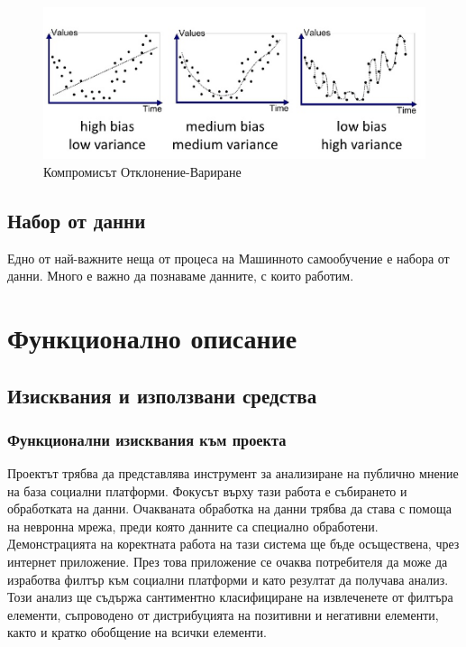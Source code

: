 \documentclass{article}
\begin{document}
\begin{figure}[H]
  \centering
  \captionsetup{justification=centering}
  \includegraphics[width=450px, keepaspectratio]{chapter-03/bias-variance.png}
  \caption{Компромисът Отклонение-Вариране}
\end{figure}

\subsection{Набор от данни}

Едно от най-важните неща от процеса на Машинното самообучение е набора от данни. Много е важно да познаваме данните, с
които работим. \cite{intro-to-ml}

\newpage\section{Функционално описание}

\subsection{Изисквания и използвани средства}

\subsubsection{Функционални изисквания към проекта}

Проектът трябва да представлява инструмент за анализиране на публично мнение на база социални платформи. Фокусът върху
тази работа е събирането и обработката на данни. Очакваната обработка на данни трябва да става с помоща на невронна
мрежа, преди която данните са специално обработени. Демонстрацията на коректната работа на тази система ще бъде
осъществена, чрез интернет приложение. През това приложение се очаква потребителя да може да изработва филтър към
социални платформи и като резултат да получава анализ. Този анализ ще съдържа сантиментно класифициране на извлеченете
от филтъра елементи, съпроводено от дистрибуцията на позитивни и негативни елементи, както и кратко обобщение на всички
елементи.
\end{document}
